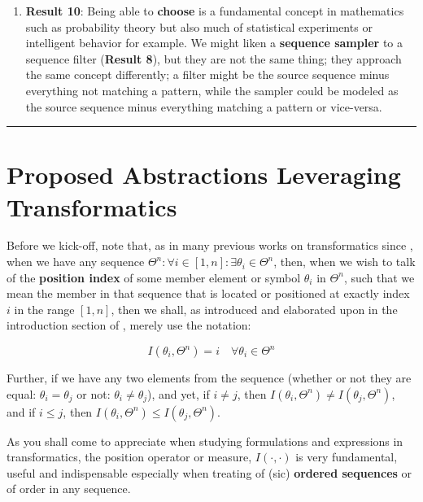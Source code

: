 \documentclass[a4paper, 18pt]{book} %
\begin{document}
{\begin{enumerate}
\item \textbf{Result 10}: Being able to \textbf{choose} is a fundamental concept in mathematics such as probability theory but also much of statistical experiments\cite{lutalo2025rng} or intelligent behavior\cite{Lutalo2025transpsy} for example. We might liken a \textbf{sequence sampler} to a sequence filter (\textbf{Result 8}), but they are not the same thing; they approach the same concept differently; a filter  might be the source sequence minus everything not matching a pattern, while the sampler could be modeled as the source sequence minus everything matching a pattern or vice-versa.

\end{enumerate} 

}
\noindent\rule{\linewidth}{0.4pt}


\section{Proposed Abstractions Leveraging Transformatics}
\label{SECPROP}

Before we kick-off, note that, as in many previous works on transformatics since \cite{transformatics}, when we have any sequence $\Theta^n : \forall i \in [1,n] : \exists \theta_i \in \Theta^n$, then, when we wish to talk of the \textbf{position index} of some member element or symbol $\theta_i$ in $\Theta^n$, such that we mean the member in that sequence that is located or positioned at exactly index $i$ in the range $[1,n]$, then we shall, as introduced and elaborated upon in the introduction section of \cite{transformatics}, merely use the notation:

\vspace{1em}
\begin{equation}
I(\theta_i, \Theta^n) = i \quad \forall \theta_i \in \Theta^n
\end{equation}
\vspace{1em}

Further, if we have any two elements from the sequence (whether or not they are equal: $\theta_i = \theta_j$ or not: $\theta_i \neq \theta_j$), and yet, if $i \neq j$, then $I(\theta_i, \Theta^n) \neq I(\theta_j, \Theta^n)$, and if $i \leq j$, then $I(\theta_i, \Theta^n) \leq I(\theta_j, \Theta^n)$. 

As you shall come to appreciate when studying formulations and expressions in transformatics, the position operator or measure, $I(\cdot, \cdot)$ is very fundamental, useful and indispensable especially when treating of (sic) \textbf{ordered sequences} or of order in any sequence.
\end{document}
